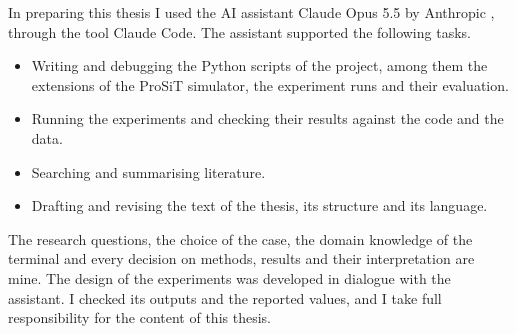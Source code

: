 In preparing this thesis I used the AI assistant Claude Opus 5.5 by Anthropic
\cite{Anthropic2026Claude}, through the tool Claude Code. The assistant supported
the following tasks.
\begin{itemize}
\item Writing and debugging the Python scripts of the project, among them the
extensions of the ProSiT simulator, the experiment runs and their evaluation.
\item Running the experiments and checking their results against the code and the
data.
\item Searching and summarising literature.
\item Drafting and revising the text of the thesis, its structure and its language.
\end{itemize}
The research questions, the choice of the case, the domain knowledge of the terminal
and every decision on methods, results and their interpretation are mine. The
design of the experiments was developed in dialogue with the assistant. I checked
its outputs and the reported values, and I take full responsibility for the content
of this thesis.
